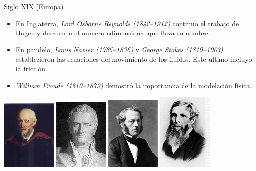 \documentclass [xcolor=svgnames, t] {beamer}
\begin{document}
\begin{frame}{Siglo XIX (Europa)}
\vspace{-0.4cm}
\begin{exampleblock}{}
\begin{itemize}
\item En Inglaterra, \emph{Lord Osborne Reynolds (1842–1912)} continuo el trabajo de Hagen y desarrollo el numero adimensional que lleva su nombre.
\item En paralelo, \emph{Louis Navier (1785–1836)} y \emph{George Stokes (1819–1903)} establecieron las ecuaciones del movimiento de los fluidos. Este ultimo incluyo la fricción.
\item \emph{William Froude (1810–1879)} demostró la importancia de la modelaci\'on física.
\end{itemize}
\end{exampleblock}
\begin{center}
\includegraphics[width=0.2\textwidth]{reyn}
\includegraphics[width=0.2\textwidth]{navier}
\includegraphics[width=0.2\textwidth]{stoke}
\includegraphics[width=0.2\textwidth]{froude}
\end{center}
\end{frame}
\end{document}
